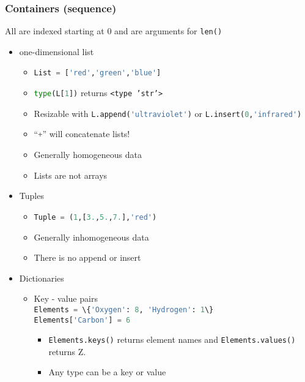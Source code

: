\documentclass[xcolor=table,10pt,final]{beamer}
\begin{document}
\begin{frame}
  \frametitle{Containers (sequence)}
  All are indexed starting at 0 and are arguments for {\tt len()}
  \begin{itemize}
    \item one-dimensional list
      \begin{itemize}
        \item \lstinline[language=python]|List = ['red','green','blue']|
        \item \lstinline[language=python]|type(L[1])| returns {\tt <type 'str'>}
        \item Resizable with \lstinline[language=python]|L.append('ultraviolet')| or \lstinline[language=python]|L.insert(0,'infrared')|
        \item ``\lstinline[language=python]|+|'' will concatenate lists!
        \item Generally homogeneous data
        \item Lists are not arrays
      \end{itemize}
    \item Tuples
      \begin{itemize}
        \item \lstinline[language=python]|Tuple = (1,[3.,5.,7.],'red')|
        \item Generally inhomogeneous data
        \item There is no append or insert
      \end{itemize}
    \item Dictionaries
      \begin{itemize}
        \item Key - value pairs\\
          \lstinline[language=python]|Elements = \{'Oxygen': 8, 'Hydrogen': 1\}|\\
          \lstinline[language=python]|Elements['Carbon'] = 6|\\
          \begin{itemize}
            \item \lstinline[language=python]|Elements.keys()| returns element names and \lstinline[language=python]|Elements.values()| returns Z.
            \item Any type can be a key or value
          \end{itemize}
      \end{itemize}
  \end{itemize}
\end{frame}
\end{document}
